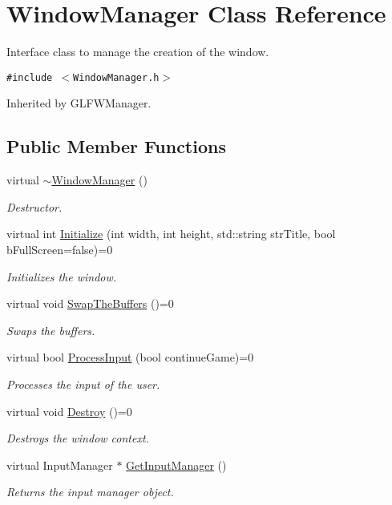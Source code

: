 \hypertarget{class_window_manager}{
\section{WindowManager Class Reference}
\label{class_window_manager}
}
Interface class to manage the creation of the window.  


{\tt \#include $<$WindowManager.h$>$}

Inherited by GLFWManager.

\subsection*{Public Member Functions}
\begin{CompactItemize}
\item 
virtual \hyperlink{class_window_manager_d2c42494d2d9045b18a3a09e5920290f}{$\sim$WindowManager} ()
\begin{CompactList}\small\item\em Destructor. \item\end{CompactList}\item 
virtual int \hyperlink{class_window_manager_b389ab7ab5fab8add272fb6e6d139a2a}{Initialize} (int width, int height, std::string strTitle, bool bFullScreen=false)=0
\begin{CompactList}\small\item\em Initializes the window. \item\end{CompactList}\item 
virtual void \hyperlink{class_window_manager_bc3dfc535171f18eda134734e6d546ef}{SwapTheBuffers} ()=0
\begin{CompactList}\small\item\em Swaps the buffers. \item\end{CompactList}\item 
virtual bool \hyperlink{class_window_manager_78beede37e932a7917c7748659af5973}{ProcessInput} (bool continueGame)=0
\begin{CompactList}\small\item\em Processes the input of the user. \item\end{CompactList}\item 
virtual void \hyperlink{class_window_manager_fdb17ba07b6589824282386dc8707b79}{Destroy} ()=0
\begin{CompactList}\small\item\em Destroys the window context. \item\end{CompactList}\item 
virtual InputManager $\ast$ \hyperlink{class_window_manager_a76f8df60f629cc88d98ab60e69278ed}{GetInputManager} ()
\begin{CompactList}\small\item\em Returns the input manager object. \item\end{CompactList}\end{CompactItemize}
